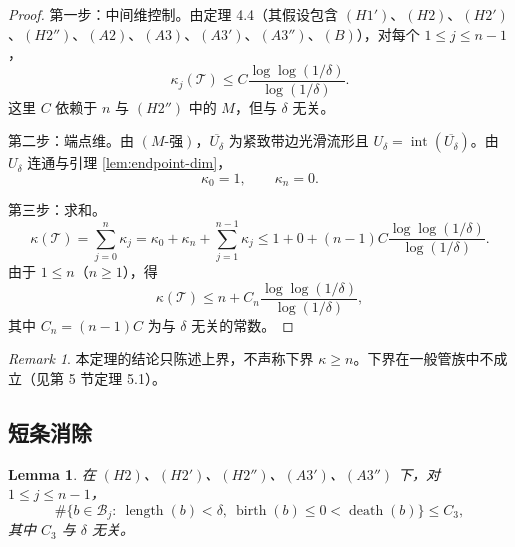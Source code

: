 \documentclass[11pt,a4paper]{article}
\newtheorem{lemma}[theorem]{Lemma}
\theoremstyle{remark}
\newtheorem{remark}[theorem]{Remark}
\begin{document}
	\begin{proof}
		第一步：中间维控制。由定理 4.4（其假设包含 $(H1')$、$(H2)$、$(H2')$、$(H2'')$、$(A2)$、$(A3)$、$(A3')$、$(A3'')$、$(B)$），对每个 $1\le j\le n-1$，
		\[
		\kappa_j(\mathcal T)\le C\frac{\log\log(1/\delta)}{\log(1/\delta)}.
		\]
		这里 $C$ 依赖于 $n$ 与 $(H2'')$ 中的 $M$，但与 $\delta$ 无关。
		
		第二步：端点维。由 $(M‑强)$，$\overline{U_\delta}$ 为紧致带边光滑流形且 $U_\delta=\operatorname{int}(\overline{U_\delta})$。由 $U_\delta$ 连通与引理 \ref{lem:endpoint-dim}，
		\[
		\kappa_0=1,\qquad \kappa_n=0.
		\]
		
		第三步：求和。
		\[
		\kappa(\mathcal T)=\sum_{j=0}^n\kappa_j
		=\kappa_0+\kappa_n+\sum_{j=1}^{n-1}\kappa_j
		\le 1+0+(n-1)C\frac{\log\log(1/\delta)}{\log(1/\delta)}.
		\]
		由于 $1\le n$（$n\ge1$），得
		\[
		\kappa(\mathcal T)\le n+C_n\frac{\log\log(1/\delta)}{\log(1/\delta)},
		\]
		其中 $C_n=(n-1)C$ 为与 $\delta$ 无关的常数。
	\end{proof}
	
	\begin{remark}
		本定理的结论只陈述上界，不声称下界 $\kappa\ge n$。下界在一般管族中不成立（见第 5 节定理 5.1）。
	\end{remark}
	
	\subsection{短条消除}
	\begin{lemma}
		在 $(H2)$、$(H2')$、$(H2'')$、$(A3')$、$(A3'')$ 下，对 $1\le j\le n-1$，
		\[
		\#\bigl\{b\in\mathcal B_j:\ \operatorname{length}(b)<\delta,\ \operatorname{birth}(b)\le0<\operatorname{death}(b)\bigr\}\le C_3,
		\]
		其中 $C_3$ 与 $\delta$ 无关。
	\end{lemma}
	
\end{document}
